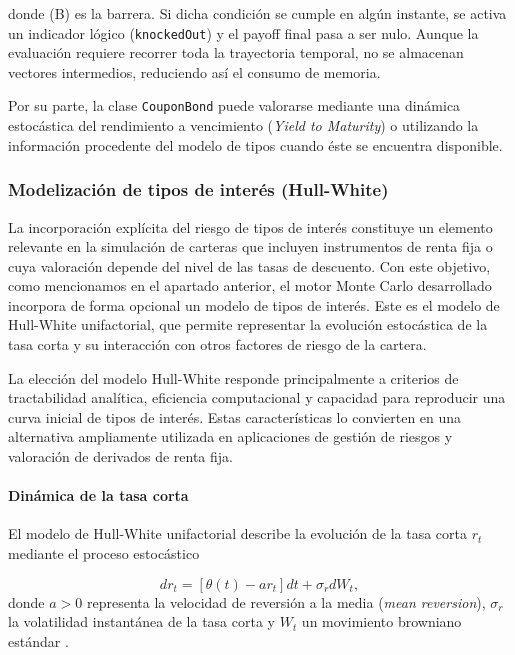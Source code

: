 \documentclass[11pt]{article}
\begin{document}
donde (B) es la barrera. Si dicha condición se cumple en algún instante, se activa un indicador lógico (\texttt{knockedOut}) y el payoff final pasa a ser nulo. Aunque la evaluación requiere recorrer toda la trayectoria temporal, no se almacenan vectores intermedios, reduciendo así el consumo de memoria.

Por su parte, la clase \texttt{CouponBond} puede valorarse mediante una dinámica estocástica del rendimiento a vencimiento (\emph{Yield to Maturity}) o utilizando la información procedente del modelo de tipos cuando éste se encuentra disponible.

\subsubsection{Modelización de tipos de interés (Hull-White)}

La incorporación explícita del riesgo de tipos de interés constituye un elemento relevante en la simulación de carteras que incluyen instrumentos de renta fija o cuya valoración depende del nivel de las tasas de descuento. Con este objetivo, como mencionamos en el apartado anterior, el motor Monte Carlo desarrollado incorpora de forma opcional un modelo de tipos de interés. Este es el modelo de Hull-White unifactorial, que permite representar la evolución estocástica de la tasa corta y su interacción con otros factores de riesgo de la cartera.

La elección del modelo Hull-White responde principalmente a criterios de tractabilidad analítica, eficiencia computacional y capacidad para reproducir una curva inicial de tipos de interés. Estas características lo convierten en una alternativa ampliamente utilizada en aplicaciones de gestión de riesgos y valoración de derivados de renta fija.

\paragraph{Dinámica de la tasa corta}

El modelo de Hull-White unifactorial describe la evolución de la tasa corta $r_t$ mediante el proceso estocástico

\begin{equation}
dr_t =
\left[
\theta(t)-a r_t
\right]dt
+
\sigma_r dW_t,
\label{eq:hw_sde}
\end{equation}
donde $a>0$ representa la velocidad de reversión a la media (\emph{mean reversion}), $\sigma_r$ la volatilidad instantánea de la tasa corta y $W_t$ un movimiento browniano estándar \cite{options2018hull}.
\end{document}
